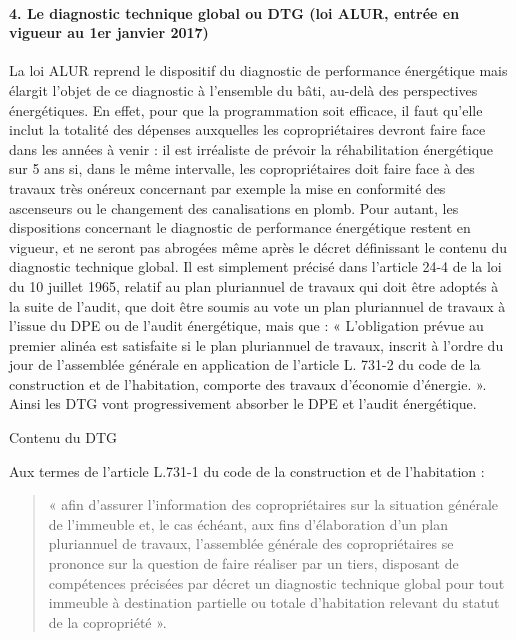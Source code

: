 		\paragraph{4. Le diagnostic technique global ou DTG (loi ALUR, entrée en vigueur au 1er janvier 2017)}
		
		La loi ALUR reprend le dispositif du diagnostic de performance énergétique mais élargit l’objet de ce diagnostic à l’ensemble du bâti, au-delà des perspectives énergétiques. En effet, pour que la programmation soit efficace, il faut qu’elle inclut la totalité des dépenses auxquelles les
		copropriétaires devront faire face dans les années à venir : il est irréaliste de prévoir la réhabilitation énergétique sur 5 ans si, dans le même intervalle, les copropriétaires doit faire face à des travaux très onéreux concernant par exemple la mise en conformité des ascenseurs ou le changement des canalisations en plomb.
		Pour autant, les dispositions concernant le diagnostic de performance énergétique restent en vigueur, et ne seront pas abrogées même après le décret définissant le contenu du diagnostic technique global.
		Il est simplement précisé dans l’article 24-4 de la loi du 10 juillet 1965, relatif au plan pluriannuel de travaux qui doit être adoptés à la suite de l’audit, que doit être soumis au vote un plan pluriannuel de travaux à l’issue du DPE ou de l’audit énergétique, mais que :
		« L’obligation prévue au premier alinéa est satisfaite si le plan pluriannuel de travaux, inscrit à l’ordre du jour de l’assemblée générale en application de l’article L. 731-2 du code de la construction et de l’habitation, comporte des travaux d’économie d’énergie. ».
		Ainsi les DTG vont progressivement absorber le DPE et l’audit énergétique.
		
		Contenu du DTG
		
		Aux termes de l’article L.731-1 du code de la construction et de l’habitation :
		\begin{quote}
			« afin d’assurer l’information des copropriétaires sur la situation générale de l’immeuble et, le cas échéant, aux fins d’élaboration d’un plan pluriannuel de travaux, l’assemblée générale des copropriétaires se prononce sur la question de faire réaliser par un tiers, disposant de compétences précisées par décret un diagnostic technique global pour tout immeuble à destination partielle ou totale d’habitation relevant du statut de la copropriété ».
		\end{quote}
		
